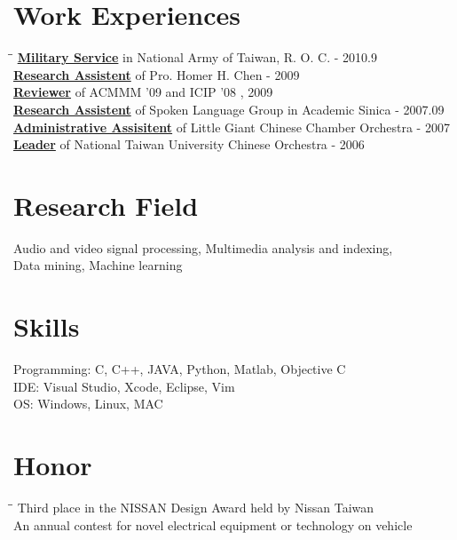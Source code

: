 \documentclass{res}
\begin{document}
\begin{CJK}{UTF8}{bsmi}
\begin{resume}
 
\section{Work Experiences}
   \vspace{-0.1in}	
   \begin{tabbing}
   \hspace{0.3in}\= \hspace{4.6in}\= \kill %
	\underline{\textbf{Military Service}} in National Army of Taiwan, R. O. C.             \> - 2010.9 \\
	\underline{\textbf{Research Assistent}} of Pro. Homer H. Chen                          \> - 2009 \\
	\underline{\textbf{Reviewer}} of ACMMM '09 and ICIP '08              \>, 2009 \\
	\underline{\textbf{Research Assistent}} of Spoken Language Group in Academic Sinica     \> - 2007.09 \\
	\underline{\textbf{Administrative Assisitent}} of Little Giant Chinese Chamber Orchestra    \> - 2007 \\
	\underline{\textbf{Leader}} of National Taiwan University Chinese Orchestra              \> - 2006 \\
   \end{tabbing}\vspace{-20pt}      %

\section{Research Field}
	Audio and video signal processing, Multimedia analysis and indexing, \\Data mining, Machine learning \\

\section{Skills}          
	Programming: C, C++, JAVA, Python, Matlab, Objective C \\
	IDE: Visual Studio, Xcode, Eclipse, Vim \\
	OS: Windows, Linux, MAC \\

\section{Honor}         
	\vspace{-0.1in}
	\begin{tabbing}
	\hspace{0.3in}\= \hspace{4.6in}\= \kill
	Third place in the NISSAN Design Award held by Nissan Taiwan \> \\
	\> An annual contest for novel electrical equipment or technology on vehicle \\
	\end{tabbing}\vspace{-20pt}


\end{resume}
\end{CJK}
\end{document}

